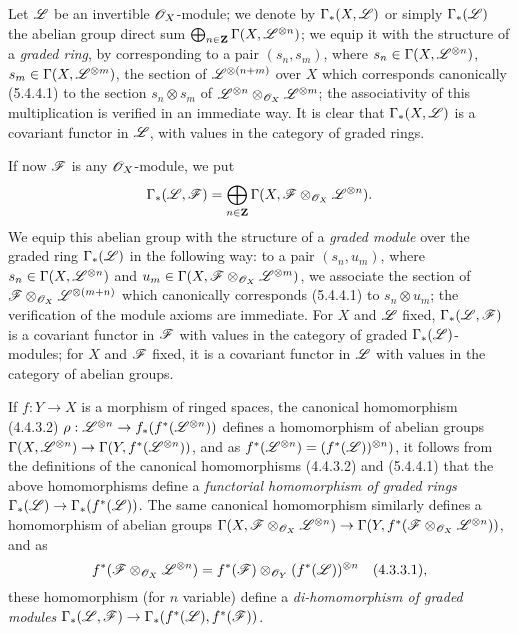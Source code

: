 \begin{env}[5.4.6]
\label{0.5.4.6}
Let $\mathscr{L}$ be an invertible $\mathscr{O}_X$-module; we denote by $\Gamma_*(X,\mathscr{L})$
or simply $\Gamma_*(\mathscr{L})$ the abelian group direct sum
$\bigoplus_{n\in\mathbf{Z}}\Gamma(X,\mathscr{L}^{\otimes n})$; we equip it with the
structure of a {\em graded ring}, by corresponding to a pair $(s_n,s_m)$, where
$s_n\in\Gamma(X,\mathscr{L}^{\otimes n})$, $s_m\in\Gamma(X,\mathscr{L}^{\otimes m})$, the
section of $\mathscr{L}^{\otimes(n+m)}$ over $X$ which corresponds canonically
(5.4.4.1) to the section $s_n\otimes s_m$ of
$\mathscr{L}^{\otimes n}\otimes_{\mathscr{O}_X}\mathscr{L}^{\otimes m}$; the associativity of this
multiplication is verified in an immediate way. It is clear that
$\Gamma_*(X,\mathscr{L})$ is a covariant functor in $\mathscr{L}$, with values in the
category of graded rings.

If now $\mathscr{F}$ is any $\mathscr{O}_X$-module, we put
\[
  \Gamma_*(\mathscr{L},\mathscr{F})
  =\bigoplus_{n\in\mathbf{Z}}\Gamma(X,\mathscr{F}\otimes_{\mathscr{O}_X}\mathscr{L}^{\otimes n}).
\]
We equip this abelian group with the structure of a {\em graded module} over
the graded ring $\Gamma_*(\mathscr{L})$ in the following way: to a pair $(s_n,u_m)$,
where $s_n\in\Gamma(X,\mathscr{L}^{\otimes n})$ and
$u_m\in\Gamma(X,\mathscr{F}\otimes_{\mathscr{O}_X}\mathscr{L}^{\otimes m})$, we associate the
section of $\mathscr{F}\otimes_{\mathscr{O}_X}\mathscr{L}^{\otimes(m+n)}$ which canonically
corresponds (5.4.4.1) to $s_n\otimes u_m$; the verification of the module axioms
are immediate. For $X$ and $\mathscr{L}$ fixed, $\Gamma_*(\mathscr{L},\mathscr{F})$ is a
covariant functor in $\mathscr{F}$ with values in the category of graded
$\Gamma_*(\mathscr{L})$-modules; for $X$ and $\mathscr{F}$ fixed, it is a covariant
functor in $\mathscr{L}$ with values in the category of abelian groups.

If $f:Y\to X$ is a morphism of ringed spaces, the canonical homomorphism
(4.4.3.2) $\rho:\mathscr{L}^{\otimes n}\to f_*(f^*(\mathscr{L}^{\otimes n}))$ defines a
homomorphism of abelian groups
$\Gamma(X,\mathscr{L}^{\otimes n})\to\Gamma(Y,f^*(\mathscr{L}^{\otimes n}))$, and as
$f^*(\mathscr{L}^{\otimes n})=(f^*(\mathscr{L}))^{\otimes n})$, it follows from the
definitions of the canonical homomorphisms (4.4.3.2) and (5.4.4.1) that the
above homomorphisms define a {\em functorial homomorphism of graded rings
$\Gamma_*(\mathscr{L})\to\Gamma_*(f^*(\mathscr{L}))$}. The same canonical homomorphism
 similarly defines a homomorphism of abelian groups
$\Gamma(X,\mathscr{F}\otimes_{\mathscr{O}_X}\mathscr{L}^{\otimes n})
  \to\Gamma(Y,f^*(\mathscr{F}\otimes_{\mathscr{O}_X}\mathscr{L}^{\otimes n}))$, and as
\[
  f^*(\mathscr{F}\otimes_{\mathscr{O}_X}\mathscr{L}^{\otimes n})
  =f^*(\mathscr{F})\otimes_{\mathscr{O}_Y}(f^*(\mathscr{L}))^{\otimes n}
  \quad(4.3.3.1),
\]
these homomorphism (for $n$ variable) define a {\em di-homomorphism of graded
modules $\Gamma_*(\mathscr{L},\mathscr{F})\to\Gamma_*(f^*(\mathscr{L}),f^*(\mathscr{F}))$}.
\end{env}

